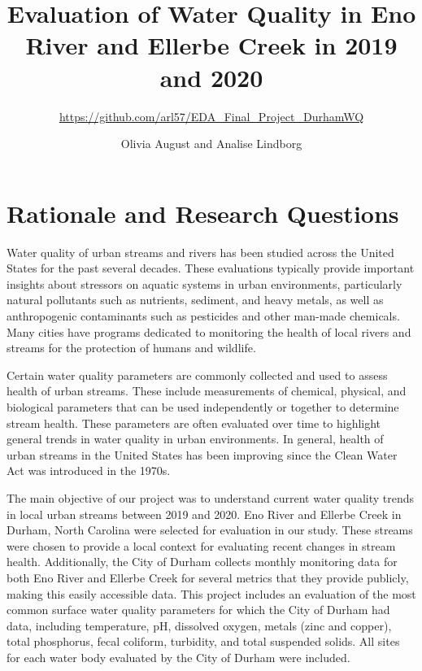 \documentclass[
  12pt,
]{article}
\title{Evaluation of Water Quality in Eno River and Ellerbe Creek in
2019 and 2020}
\subtitle{\url{https://github.com/arl57/EDA_Final_Project_DurhamWQ}}
\author{Olivia August and Analise Lindborg}
\date{}
\begin{document}
\maketitle

\newpage
\tableofcontents 
\newpage
\listoftables 
\newpage
\listoffigures 
\newpage

\hypertarget{rationale-and-research-questions}{%
\section{Rationale and Research
Questions}\label{rationale-and-research-questions}}

Water quality of urban streams and rivers has been studied across the
United States for the past several decades. These evaluations typically
provide important insights about stressors on aquatic systems in urban
environments, particularly natural pollutants such as nutrients,
sediment, and heavy metals, as well as anthropogenic contaminants such
as pesticides and other man-made chemicals. Many cities have programs
dedicated to monitoring the health of local rivers and streams for the
protection of humans and wildlife.

Certain water quality parameters are commonly collected and used to
assess health of urban streams. These include measurements of chemical,
physical, and biological parameters that can be used independently or
together to determine stream health. These parameters are often
evaluated over time to highlight general trends in water quality in
urban environments. In general, health of urban streams in the United
States has been improving since the Clean Water Act was introduced in
the 1970s.

The main objective of our project was to understand current water
quality trends in local urban streams between 2019 and 2020. Eno River
and Ellerbe Creek in Durham, North Carolina were selected for evaluation
in our study. These streams were chosen to provide a local context for
evaluating recent changes in stream health. Additionally, the City of
Durham collects monthly monitoring data for both Eno River and Ellerbe
Creek for several metrics that they provide publicly, making this easily
accessible data. This project includes an evaluation of the most common
surface water quality parameters for which the City of Durham had data,
including temperature, pH, dissolved oxygen, metals (zinc and copper),
total phosphorus, fecal coliform, turbidity, and total suspended solids.
All sites for each water body evaluated by the City of Durham were
included.
\end{document}
